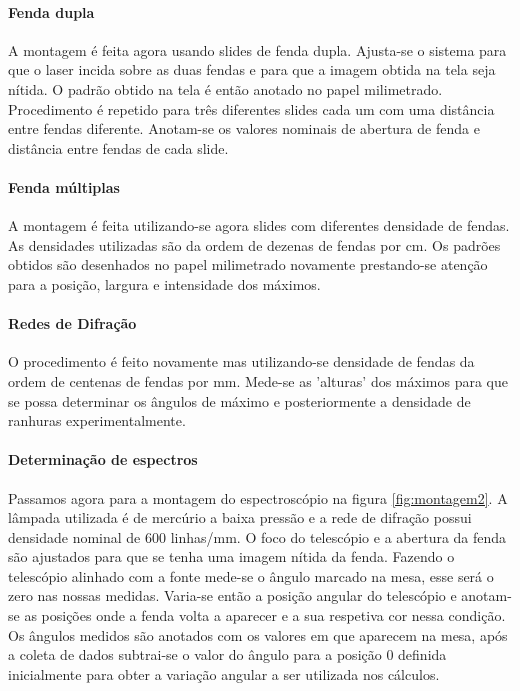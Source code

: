 \documentclass[a4paper,11pt]{article}
\begin{document}
\paragraph{Fenda dupla} A montagem é feita agora usando slides de fenda dupla.
Ajusta-se o sistema para que o laser incida sobre as duas fendas e para que
a imagem obtida na tela seja nítida. O padrão obtido na tela é então anotado no
papel milimetrado. Procedimento é repetido para
três diferentes slides cada um com
uma distância entre fendas diferente.
Anotam-se os valores nominais de abertura de fenda
e distância entre fendas de cada slide.

\paragraph{Fenda múltiplas} A montagem é
feita utilizando-se agora slides com diferentes
densidade de fendas. As densidades utilizadas são da ordem de 
dezenas de fendas por cm.
Os padrões obtidos são desenhados no papel milimetrado novamente 
prestando-se atenção para a posição, largura e intensidade dos máximos.

\paragraph{Redes de Difração} O procedimento é feito novamente mas utilizando-se
densidade de fendas da ordem de centenas de fendas por
mm. Mede-se as 'alturas' dos máximos
para que se possa determinar os ângulos de máximo e
posteriormente a densidade de ranhuras
experimentalmente.

\paragraph{Determinação de espectros} Passamos agora para a montagem do 
espectroscópio na figura \ref{fig:montagem2}. A lâmpada utilizada é 
de mercúrio a baixa pressão e a rede de difração possui densidade nominal de
600 linhas/mm. O foco do telescópio
e a abertura da fenda são ajustados para que se tenha 
uma imagem nítida da fenda. Fazendo o telescópio alinhado com a fonte mede-se
o ângulo marcado na mesa, esse será o zero nas nossas medidas.
Varia-se então a posição angular do telescópio e anotam-se 
as posições onde a fenda volta a aparecer e a sua respetiva cor
nessa condição. Os ângulos medidos são anotados com os valores
em que aparecem na mesa, após a coleta de dados subtrai-se o
valor do ângulo para a posição 0 definida inicialmente para
obter a variação angular a ser utilizada nos cálculos.
\end{document}
